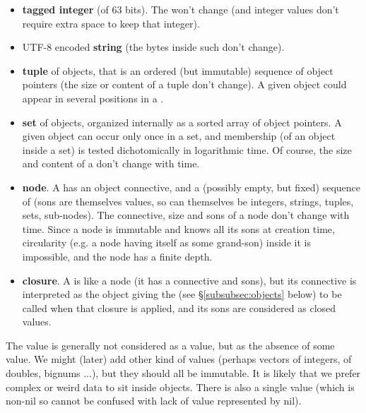\begin{itemize}

\item \textbf{tagged integer} (of 63 bits). The  won't change
  (and integer values don't require extra space to keep that integer).
  
\item UTF-8 encoded \textbf{string} (the bytes inside such
   don't change).

  \item \textbf{tuple} of objects, that is an ordered (but immutable)
    sequence of object pointers (the size or content of a tuple don't
    change). A given object could appear in several positions in a
    .

  \item \textbf{set} of objects, organized internally as a sorted
    array of object pointers. A given object can occur only once in a
    set, and membership (of an object inside a set) is tested
    dichotomically in logarithmic time. Of course, the size and
    content of a  don't change with time.

  \item \textbf{node}. A  has an object connective,
    and a (possibly empty, but fixed) sequence of 
    (sons are themselves values, so can themselves be integers,
    strings, tuples, sets, sub-nodes). The connective, size and sons
    of a node don't change with time. Since a node is immutable and
    knows all its sons at creation time, circularity (e.g. a node
    having itself as some grand-son) inside it is impossible, and the
    node has a finite depth.

  \item \textbf{closure}. A  is like a node
    (it has a connective and sons), but its connective is interpreted
    as the object giving the  (see
    §\ref{subsubsec:objects} below) to be called when that closure is
    applied, and its sons are considered as closed values.
        
\end{itemize}

The  value is generally not considered as a
value, but as the absence of some value. We might (later) add other
kind of values (perhaps vectors of integers, of doubles, bignums ...),
but they should all be immutable. It is likely that we prefer complex
or weird data to sit inside objects. There is also a single
 value (which is non-nil so
cannot be confused with lack of value represented by nil).

